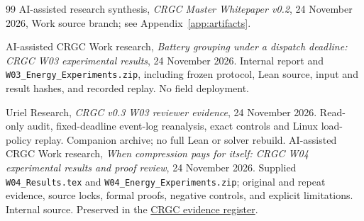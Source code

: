 \documentclass[11pt,letterpaper]{article}
\begin{document}
\begin{thebibliography}{99}
 AI-assisted research synthesis, \emph{CRGC Master Whitepaper v0.2}, 24 November 2026, Work source branch; see Appendix~\ref{app:artifacts}.

 AI-assisted CRGC Work research, \emph{Battery grouping under a dispatch deadline: CRGC W03 experimental results}, 24 November 2026. Internal report and \texttt{W03\_Energy\_Experiments.zip}, including frozen protocol, Lean source, input and result hashes, and recorded replay. No field deployment.

 Uriel Research, \emph{CRGC v0.3 W03 reviewer evidence}, 24 November 2026. Read-only audit, fixed-deadline event-log reanalysis, exact controls and Linux load-policy replay. Companion archive; no full Lean or solver rebuild.
 AI-assisted CRGC Work research, \emph{When compression pays for itself: CRGC W04 experimental results and proof review}, 24 November 2026. Supplied \texttt{W04\_Results.tex} and \texttt{W04\_Energy\_Experiments.zip}; original and repeat evidence, source locks, formal proofs, negative controls, and explicit limitations. Internal source. Preserved in the \href{https://chatgpt.com/space/page_401978a551908191b29294e4c7019840}{CRGC evidence register}.


\end{thebibliography}
\end{document}
